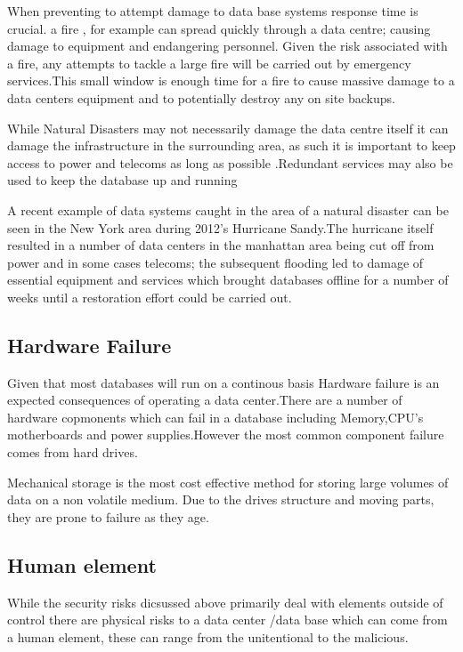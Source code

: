\documentclass[11pt, twocolumn]{article}
\begin{document}
When preventing to attempt damage to data base systems response time is crucial. a fire , for example  can spread quickly through a data centre; causing damage to equipment and endangering personnel. Given the risk associated with a fire, any attempts to tackle a large fire will be carried out by emergency services.This small window is enough time for a fire to cause massive damage to a data centers equipment and to potentially destroy any on site backups.

While Natural Disasters may not necessarily damage the data centre itself it can damage the infrastructure in the surrounding area, as such it is important to keep access to power and telecoms as long as possible .Redundant services may also be used to keep the database up and running  

A recent example of data systems caught in the area of a natural disaster can be seen in the New York area during 2012's Hurricane Sandy.The hurricane itself resulted in a number of data centers in the manhattan area being cut off from power and in some cases telecoms; the subsequent flooding led to damage of essential equipment and services which brought databases offline for a number of weeks until a restoration effort could be carried out.\cite{sean4}


\subsection{Hardware Failure}

Given that most databases will run on a continous basis Hardware failure is an expected consequences of operating a data center.There are a number of hardware copmonents which can fail in a database including Memory,CPU's motherboards and power supplies\cite{sean9}.However the most common component failure comes from hard drives.

Mechanical storage is the most cost effective method for storing large volumes of data on a non volatile medium\cite{sean2}. Due to the drives structure and moving parts, they are prone to failure as they age.

 


\subsection{Human element}

While the security risks dicsussed above primarily deal with elements outside of control there are physical risks to a data center /data base which can come from a human element, these can range from the unitentional to the malicious.
\end{document}
